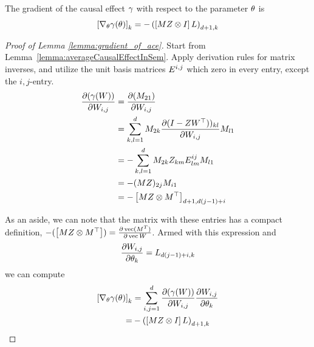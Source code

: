 \begin{lemma}
\label{lemma:gradient_of_ace}
The gradient of the causal effect $\gamma$ with respect to the parameter $\theta$ is 
\begin{align}
\left[ \nabla _\theta \gamma(\theta) \right]_k = -\left( \left[M Z \otimes I \right] L \right)_{d+1,k} 
\end{align}
\end{lemma}
\begin{proof}[Proof of Lemma \ref{lemma:gradient_of_ace}]
Start from Lemma~\ref{lemma:averageCausalEffectInSem}. Apply derivation rules for matrix inverses, and utilize the unit basis matrices $E^{i,j}$ which zero in every entry, except the $i,j$-entry.
\begin{align}
    \frac{\partial(\gamma(W))}{\partial W_{i,j}} &= \frac{\partial(M_{21})}{\partial W_{i,j}}  \\ &=\sum_{k,l=1}^d M_{2k} \frac{\partial( I - ZW^\top))_{kl}}{\partial W_{i,j}} M_{l1} \\
    &=-\sum_{k,l=1}^d M_{2k} Z_{km} E^{ij}_{lm} M_{l1}  \\
    &= -(M Z)_{2j}M_{i1} \\
    &= -\left[ M Z \otimes M^\top  \right]_{d+1,d(j-1)+i} \\
\end{align}

As an aside, we can note that the matrix with these entries has a compact definition, $-(\left[ M Z \otimes M^\top  \right]) = \frac{\partial \operatorname*{vec}(M^{T})}{\partial \operatorname*{vec} W}$. Armed with this expression and 
\begin{align}
    \frac{\partial W_{i,j}}{\partial \theta_k} = L_{d(j-1)+i,k}
\end{align}
we can compute 
\begin{align}
\left[ \nabla _\theta \gamma(\theta) \right]_k 
&= \sum_{i,j=1}^d \frac{\partial(\gamma(W))}{\partial W_{i,j}}\frac{\partial W_{i,j}}{\partial \theta_k} \\ 
=&-\left( \left[M Z \otimes I \right]  L \right)_{d+1,k}
\end{align}
\end{proof}

